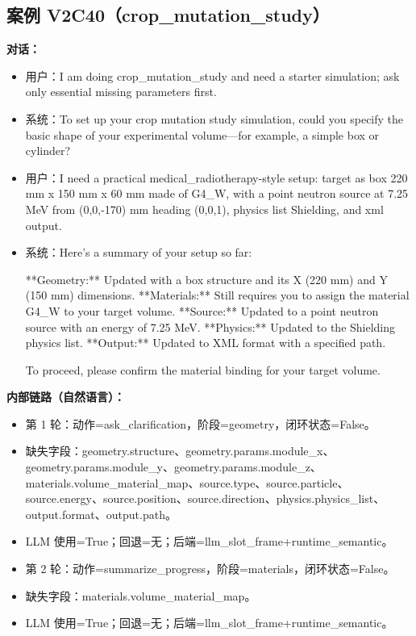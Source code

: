 \documentclass[11pt]{ctexart}
\begin{document}
\subsection{案例 V2C40（crop\_mutation\_study）}
\textbf{对话：}
\begin{itemize}
\item 用户：I am doing crop\_mutation\_study and need a starter simulation; ask only essential missing parameters first.
\item 系统：To set up your crop mutation study simulation, could you specify the basic shape of your experimental volume—for example, a simple box or cylinder?
\item 用户：I need a practical medical\_radiotherapy-style setup: target as box 220 mm x 150 mm x 60 mm made of G4\_W, with a point neutron source at 7.25 MeV from (0,0,-170) mm heading (0,0,1), physics list Shielding, and xml output.
\item 系统：Here's a summary of your setup so far:

**Geometry:** Updated with a box structure and its X (220 mm) and Y (150 mm) dimensions.
**Materials:** Still requires you to assign the material G4\_W to your target volume.
**Source:** Updated to a point neutron source with an energy of 7.25 MeV.
**Physics:** Updated to the Shielding physics list.
**Output:** Updated to XML format with a specified path.

To proceed, please confirm the material binding for your target volume.
\end{itemize}
\textbf{内部链路（自然语言）：}
\begin{itemize}
\item 第 1 轮：动作=ask\_clarification，阶段=geometry，闭环状态=False。
\item 缺失字段：geometry.structure、geometry.params.module\_x、geometry.params.module\_y、geometry.params.module\_z、materials.volume\_material\_map、source.type、source.particle、source.energy、source.position、source.direction、physics.physics\_list、output.format、output.path。
\item LLM 使用=True；回退=无；后端=llm\_slot\_frame+runtime\_semantic。
\item 第 2 轮：动作=summarize\_progress，阶段=materials，闭环状态=False。
\item 缺失字段：materials.volume\_material\_map。
\item LLM 使用=True；回退=无；后端=llm\_slot\_frame+runtime\_semantic。
\end{itemize}
\end{document}
